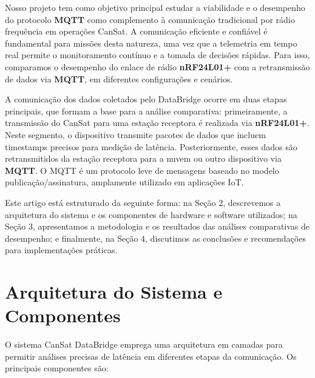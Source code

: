 \documentclass[hidelinks]{sbrt}
\begin{document}
Nosso projeto tem como objetivo principal estudar a viabilidade e o desempenho do protocolo \textbf{MQTT} como complemento à comunicação tradicional por rádio frequência em operações CanSat. A comunicação eficiente e confiável é fundamental para missões desta natureza, uma vez que a telemetria em tempo real permite o monitoramento contínuo e a tomada de decisões rápidas. Para isso, comparamos o desempenho do enlace de rádio \textbf{nRF24L01+} com a retransmissão de dados via \textbf{MQTT}, em diferentes configurações e cenários.

A comunicação dos dados coletados pelo DataBridge ocorre em duas etapas principais, que formam a base para a análise comparativa: primeiramente, a transmissão do CanSat para uma estação receptora é realizada via \textbf{nRF24L01+}. Neste segmento, o dispositivo transmite pacotes de dados que incluem timestamps precisos para medição de latência. 
Posteriormente, esses dados são retransmitidos da estação receptora para a nuvem ou outro dispositivo via \textbf{MQTT}. O MQTT é um protocolo leve de mensagens baseado no modelo publicação/assinatura, amplamente utilizado em aplicações IoT.

Este artigo está estruturado da seguinte forma: na Seção 2, descrevemos a arquitetura do sistema e os componentes de hardware e software utilizados; na Seção 3, apresentamos a metodologia e os resultados das análises comparativas de desempenho; e finalmente, na Seção 4, discutimos as conclusões e recomendações para implementações práticas.

\section{Arquitetura do Sistema e Componentes}
\label{sec: descricao do sistema}

O sistema CanSat DataBridge emprega uma arquitetura em camadas para permitir análises precisas de latência em diferentes etapas da comunicação. Os principais componentes são:
\end{document}
